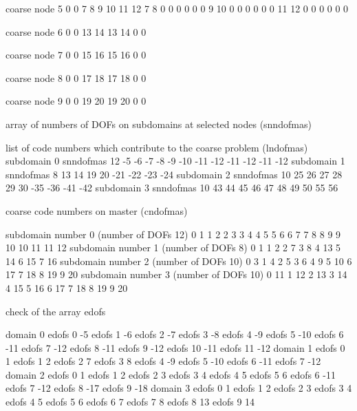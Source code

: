  coarse node      5
         0     0        7     8        9    10       11    12
         7     8        0     0        0     0        0     0
         9    10        0     0        0     0        0     0
        11    12        0     0        0     0        0     0

 coarse node      6
         0     0       13    14
        13    14        0     0

 coarse node      7
         0     0       15    16
        15    16        0     0

 coarse node      8
         0     0       17    18
        17    18        0     0

 coarse node      9
         0     0       19    20
        19    20        0     0


 array of numbers of DOFs on subdomains at selected nodes (snndofmas)


 list of code numbers which contribute to the coarse problem (lndofmas)
 subdomain      0   snndofmas     12
   -5   -6   -7   -8   -9   -10   -11   -12   -11   -12   -11   -12
 subdomain      1   snndofmas      8
   13   14   19   20   -21   -22   -23   -24
 subdomain      2   snndofmas     10
   25   26   27   28   29   30   -35   -36   -41   -42
 subdomain      3   snndofmas     10
   43   44   45   46   47   48   49   50   55   56

 coarse code numbers on master (cndofmas)

 subdomain number      0 (number of DOFs 12)
      0   1
      1   2
      2   3
      3   4
      4   5
      5   6
      6   7
      7   8
      8   9
      9   10
     10   11
     11   12
 subdomain number      1 (number of DOFs 8)
      0   1
      1   2
      2   7
      3   8
      4   13
      5   14
      6   15
      7   16
 subdomain number      2 (number of DOFs 10)
      0   3
      1   4
      2   5
      3   6
      4   9
      5   10
      6   17
      7   18
      8   19
      9   20
 subdomain number      3 (number of DOFs 10)
      0   11
      1   12
      2   13
      3   14
      4   15
      5   16
      6   17
      7   18
      8   19
      9   20


 check of the array edofs 

 domain 0
 edofs       0      -5
 edofs       1      -6
 edofs       2      -7
 edofs       3      -8
 edofs       4      -9
 edofs       5     -10
 edofs       6     -11
 edofs       7     -12
 edofs       8     -11
 edofs       9     -12
 edofs      10     -11
 edofs      11     -12
 domain 1
 edofs       0       1
 edofs       1       2
 edofs       2       7
 edofs       3       8
 edofs       4      -9
 edofs       5     -10
 edofs       6     -11
 edofs       7     -12
 domain 2
 edofs       0       1
 edofs       1       2
 edofs       2       3
 edofs       3       4
 edofs       4       5
 edofs       5       6
 edofs       6     -11
 edofs       7     -12
 edofs       8     -17
 edofs       9     -18
 domain 3
 edofs       0       1
 edofs       1       2
 edofs       2       3
 edofs       3       4
 edofs       4       5
 edofs       5       6
 edofs       6       7
 edofs       7       8
 edofs       8      13
 edofs       9      14

